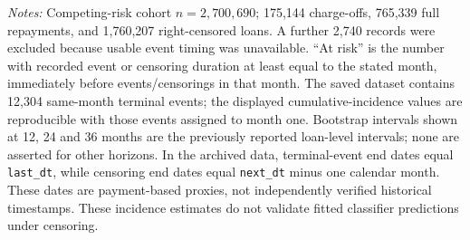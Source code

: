 
\begin{table}[!htbp]
\centering
\caption{Competing-risk cumulative incidence and follow-up support.
Observed charge-off is the event of interest, full repayment is a
competing event, and unresolved loans are right-censored.}
\label{tab:competing_risk}
\vspace{3pt}
\begin{minipage}{\textwidth}
\footnotesize
\textit{Notes:} Competing-risk cohort $n=2{,}700{,}690$;
175,144 charge-offs, 765,339 full repayments, and 1,760,207
right-censored loans. A further 2,740 records were excluded because
usable event timing was unavailable. ``At risk'' is the number with
recorded event or censoring duration at least equal to the stated
month, immediately before events/censorings in that month. The saved
dataset contains 12,304 same-month terminal events; the displayed
cumulative-incidence values are reproducible with those events assigned
to month one. Bootstrap intervals shown at 12, 24 and 36 months are
the previously reported loan-level intervals; none are asserted for
other horizons. In the archived data, terminal-event end dates equal
\texttt{last\_dt}, while censoring end dates equal
\texttt{next\_dt} minus one calendar month. These dates are
payment-based proxies, not independently verified historical timestamps.
These incidence estimates do not validate fitted classifier predictions
under censoring.
\end{minipage}
\end{table}

